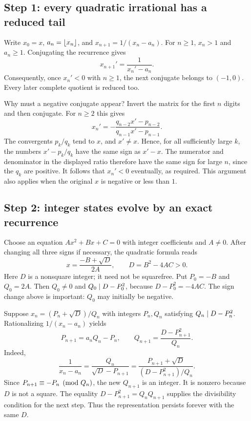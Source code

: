 \subsection*{Step 1: every quadratic irrational has a reduced tail}
Write $x_0=x$, $a_n=\left\lfloor x_n\right\rfloor$, and
$x_{n+1}=1/(x_n-a_n)$. For $n\ge1$, $x_n>1$ and $a_n\ge1$.
Conjugating the recurrence gives
\[
 x_{n+1}'=\frac1{x_n'-a_n}.
\]
Consequently, once $x_n'<0$ with $n\ge1$, the next conjugate belongs to
$(-1,0)$. Every later complete quotient is reduced too.

Why must a negative conjugate appear? Invert the matrix for the first
$n$ digits and then conjugate. For $n\ge2$ this gives
\[
 x_n'=-\frac{q_{n-2}x'-p_{n-2}}{q_{n-1}x'-p_{n-1}}.
\]
The convergents $p_k/q_k$ tend to $x$, and $x'\ne x$. Hence, for all
sufficiently large $k$, the numbers
$x'-p_k/q_k$ have the same sign as $x'-x$.
The numerator and denominator in the displayed ratio therefore have
the same sign for large $n$, since the $q_k$ are positive.
It follows that $x_n'<0$ eventually, as required.
This argument also applies when the original $x$ is negative or less
than $1$.

\subsection*{Step 2: integer states evolve by an exact recurrence}
Choose an equation $Ax^2+Bx+C=0$ with integer coefficients and $A\ne0$.
After changing all three signs if necessary, the quadratic formula reads
\[
 x=\frac{-B+\sqrt D}{2A},
 \qquad D=B^2-4AC>0.
\]
Here $D$ is a nonsquare integer; it need not be squarefree. Put
$P_0=-B$ and $Q_0=2A$. Then $Q_0\ne0$ and
$Q_0\mid D-P_0^2$, because $D-P_0^2=-4AC$.
The sign change above is important: $Q_0$ may initially be negative.

Suppose $x_n=(P_n+\sqrt D)/Q_n$ with integers $P_n,Q_n$ satisfying
$Q_n\mid D-P_n^2$. Rationalizing $1/(x_n-a_n)$ yields
\begin{equation}\label{eq:quadratic-state-recurrence}
 \boxed{\quad
 P_{n+1}=a_nQ_n-P_n,\qquad
 Q_{n+1}=\frac{D-P_{n+1}^2}{Q_n}.
 \quad}
\end{equation}
Indeed,
\[
 \frac1{x_n-a_n}
 =\frac{Q_n}{\sqrt D-P_{n+1}}
 =\frac{P_{n+1}+\sqrt D}{(D-P_{n+1}^2)/Q_n}.
\]
Since $P_{n+1}\equiv-P_n\pmod{Q_n}$, the new $Q_{n+1}$ is an integer.
It is nonzero because $D$ is not a square. The equality
$D-P_{n+1}^2=Q_nQ_{n+1}$ supplies the divisibility condition for the
next step. Thus the representation persists forever with the same $D$.

